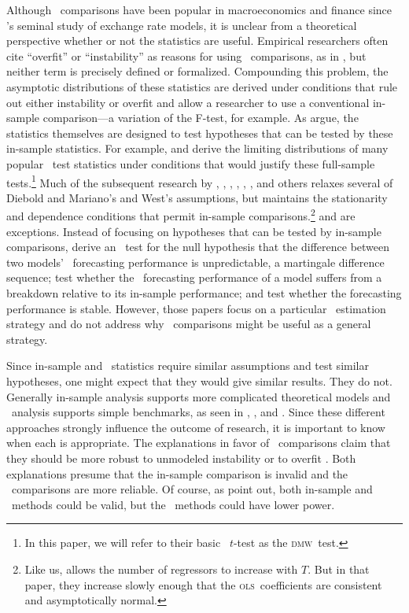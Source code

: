 \documentclass[11pt]{article}
\newcommand{\citepos}[1]{\citeauthor{#1}'s \citeyearpar{#1}}
\newcommand{\dmw}{\textsc{dmw}}
\newcommand{\ols}{\textsc{ols}}
\begin{document}
Although \oos\ comparisons have been popular in macroeconomics and
finance since \citepos{MeR:83} seminal study of exchange rate models,
it is unclear from a theoretical perspective whether or not the
statistics are useful.  Empirical researchers often cite ``overfit''
or ``instability'' as reasons for using \oos\ comparisons, as in
\citet{StW:03}, but neither term is precisely defined or formalized.
Compounding this problem, the asymptotic distributions of these
statistics are derived under conditions that rule out either
instability or overfit and allow a researcher to use a conventional
in-sample comparison---a variation of the F-test, for example.  As
\citet{InK:04} argue, the statistics themselves are designed to test
hypotheses that can be tested by these in-sample statistics.  For
example, \citet{DiM:95} and \citet{Wes:96} derive the limiting
distributions of many popular \oos\ test statistics under conditions
that would justify these full-sample tests.\footnote{In this paper, we
  will refer to their basic \oos\ $t$-test as the \dmw\ test.}  Much
of the subsequent research by \citet{Mcc:00, Mcc:07}, \citet{CCS:01},
\citet{ClM:01,ClM:05}, \citet{CoS:02,CoS:04}, \citet{ClW:06,ClW:07},
\citet{Ana:07}, and others relaxes several of Diebold and Mariano's
and West's assumptions, but maintains the stationarity and dependence
conditions that permit in-sample comparisons.\footnote{Like us,
  \citet{Ana:07} allows the number of regressors to increase with $T$.
  But in that paper, they increase slowly enough that the \ols\
  coefficients are consistent and asymptotically normal.}
\citet{GiW:06} and \citet{GiR:09, GiR:10} are exceptions.  Instead of
focusing on hypotheses that can be tested by in-sample comparisons,
\citet{GiW:06} derive an \oos\ test for the null hypothesis that the
difference between two models' \oos\ forecasting performance is
unpredictable, a martingale difference sequence; \citet{GiR:09} test
whether the \oos\ forecasting performance of a model suffers from a
breakdown relative to its in-sample performance; and \citet{GiR:10}
test whether the forecasting performance is stable. However, those
papers focus on a particular \oos\ estimation strategy and do not
address why \oos\ comparisons might be useful as a general strategy.

Since in-sample and \oos\ statistics require similar assumptions and
test similar hypotheses, one might expect that they would give similar
results.  They do not.  Generally in-sample analysis supports more
complicated theoretical models and \oos\ analysis supports simple
benchmarks, as seen in \citet{MeR:83}, \citet{StW:03}, and
\citet{GoW:08}.  Since these different approaches strongly influence
the outcome of research, it is important to know when each is
appropriate.  The explanations in favor of \oos\ comparisons claim
that they should be more robust to unmodeled instability
\citep{ClM:05,GiW:06,GiR:09,GiR:10} or to overfit
\citep{Mcc:98,Cla:04}.  Both explanations presume that the in-sample
comparison is invalid and the \oos\ comparisons are more reliable.  Of
course, as \citet{InK:04,InK:06} point out, both in-sample and \oos\
methods could be valid, but the \oos\ methods could have lower power.
\end{document}
